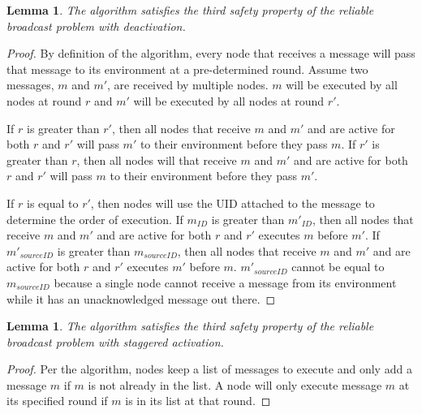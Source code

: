 \documentclass[english]{article}
\newtheorem{lemma}[theorem]{Lemma}
\begin{document}
\begin{lemma}
\label{DeactivationRBSafety2}
The algorithm satisfies the third safety property of the reliable broadcast problem with deactivation.
\end{lemma}
\begin{proof}

By definition of the algorithm, every node that receives a message will pass that message to its environment at a pre-determined round. Assume two messages, $m$ and $m'$, are received by multiple nodes. $m$ will be executed by all nodes at round $r$ and $m'$ will be executed by all nodes at round $r'$.

If $r$ is greater than $r'$, then all nodes that receive $m$ and $m'$ and are active for both $r$ and $r'$ will pass $m'$ to their environment before they pass $m$. If $r'$ is greater than $r$, then all nodes will that receive $m$ and $m'$ and are active for both $r$ and $r'$ will pass $m$ to their environment before they pass $m'$.

If $r$ is equal to $r'$, then nodes will use the UID attached to the message to determine the order of execution. If $m_{ID}$ is greater than $m'_{ID}$, then all nodes that receive $m$ and $m'$ and are active for both $r$ and $r'$ executes $m$ before $m'$. If $m'_{sourceID}$ is greater than $m_{sourceID}$, then all nodes that receive $m$ and $m'$ and are active for both $r$ and $r'$ executes $m'$ before $m$. $m'_{sourceID}$ cannot be equal to $m_{sourceID}$ because a single node cannot receive a message from its environment while it has an unacknowledged message out there.



\end{proof}


\begin{lemma}
\label{DeactivationRBSafety3}
The algorithm satisfies the third safety property of the reliable broadcast problem with staggered activation.
\end{lemma}
\begin{proof}

Per the algorithm, nodes keep a list of messages to execute and only add a message $m$ if $m$ is not already in the list. A node will only execute message $m$ at its specified round if $m$ is in its list at that round.

\end{proof}
\end{document}
